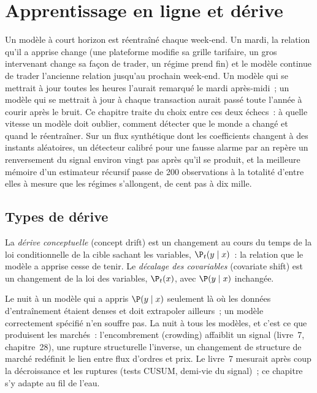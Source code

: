 \chapter{Apprentissage en ligne et dérive}\label{ch:ml:online-learning-and-drift}

Un modèle à court horizon est réentraîné chaque week-end. Un mardi, la relation qu'il a apprise change (une plateforme modifie sa grille
tarifaire, un gros intervenant change sa façon de trader, un régime prend fin) et le modèle continue de trader l'ancienne relation jusqu'au
prochain week-end. Un modèle qui se mettrait à jour toutes les heures l'aurait remarqué le mardi après-midi~; un modèle qui se
mettrait à jour à chaque transaction aurait passé toute l'année à courir après le bruit. Ce chapitre traite du choix entre ces deux
échecs~: à quelle vitesse un modèle doit oublier, comment détecter que le monde a changé et quand le réentraîner. Sur un
flux synthétique dont les coefficients changent à des instants aléatoires, un détecteur calibré pour une fausse alarme par an repère un
renversement du signal environ vingt pas après qu'il se produit, et la meilleure mémoire d'un estimateur récursif passe de 200
observations à la totalité d'entre elles à mesure que les régimes s'allongent, de cent pas à dix mille.

\section{Types de dérive}

\begin{definition}\label{def:ml:online-learning-and-drift:drift}
La \emph{dérive conceptuelle} (concept drift) est un changement au cours du temps de la loi conditionnelle de la cible sachant les
variables, $\P_t(y\mid x)$~: la relation que le modèle a apprise cesse de tenir. Le \emph{décalage des covariables} (covariate shift)
est un changement de la loi des variables, $\P_t(x)$, avec $\P(y\mid x)$ inchangée.
\end{definition}

Le  nuit à un modèle qui a appris $\P(y\mid x)$ seulement là où les données d'entraînement étaient denses et doit extrapoler
ailleurs~; un modèle correctement spécifié n'en souffre pas. La  nuit à tous les modèles, et c'est ce que produisent les marchés~:
l'encombrement (crowding) affaiblit un signal (livre~7, chapitre~28), une rupture structurelle l'inverse, un changement de structure de marché redéfinit le
lien entre flux d'ordres et prix. Le livre~7 mesurait après coup la décroissance et les ruptures (tests CUSUM, demi-vie
du signal)~; ce chapitre s'y adapte au fil de l'eau.


